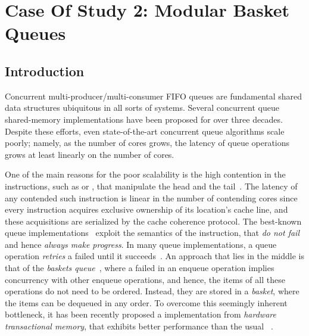 \chapter{\label{chapter:5_modular-basket-queues}Case Of Study 2: Modular Basket Queues}

\section{Introduction}

Concurrent multi-producer/multi-consumer FIFO queues are fundamental shared data structures ubiquitous in all sorts of systems. Several concurrent queue shared-memory implementations have been proposed for over three decades. Despite these efforts, even state-of-the-art concurrent queue algorithms scale poorly; namely, as the number of cores grows, the latency of queue operations grows at least linearly on the number of cores.

One of the main reasons for the poor scalability is the high contention in the \RMW instructions, such as \CAS or \FAI, that manipulate the head and the tail~\cite{DBLP_conf_spaa_FatourouK11, DBLP_conf_ppopp_FatourouK12, basketqueue2007, DBLP_conf_ppopp_KoganP11, DBLP_journals_dc_Ladan-MozesS08, DBLP_conf_podc_MichaelS96, DBLP_journals_topc_Milman-SelaKLLP22, ppopp2013x86queues, scalingconcurrent2020, DBLP_conf_ppopp_YangM16}. The latency of any contended such instruction is linear in the number of contending cores since every instruction acquires exclusive ownership of its location’s cache line, and these acquisitions are serialized by the cache coherence protocol. The best-known queue implementations~\cite{ppopp2013x86queues, DBLP_conf_ppopp_YangM16} exploit the semantics of the \FAI instruction, that \emph{do not fail} and hence \emph{always make progress}.  In many queue implementations, a queue operation \emph{retries} a failed \CAS until it succeeds~\cite{DBLP_conf_spaa_FatourouK11, DBLP_conf_ppopp_FatourouK12, DBLP_conf_ppopp_KoganP11, DBLP_journals_dc_Ladan-MozesS08, DBLP_conf_podc_MichaelS96, DBLP_journals_topc_Milman-SelaKLLP22}.  An approach that lies in the middle is that of the \emph{baskets queue}~\cite{basketqueue2007}, where a failed \CAS in an enqueue operation implies concurrency with other enqueue operations, and hence, the items of all these operations do not need to be ordered. Instead, they are stored in a \emph{basket}, where the items can be dequeued in any order. To overcome this seemingly inherent bottleneck, it has been recently proposed a \CAS implementation from \emph{hardware transactional memory}, that exhibits better performance than the usual \CAS~\cite{scalingconcurrent2020}.

